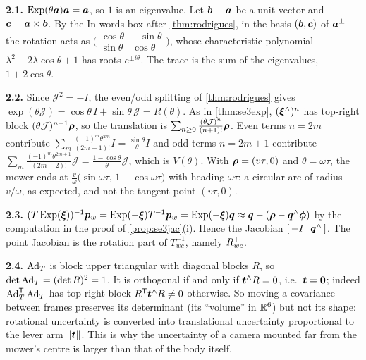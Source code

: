 \textbf{2.1.} $\operatorname{Exp}(\theta\bm{a})\bm{a}=\bm{a}$, so $1$ is an
eigenvalue. Let $\bm{b}\perp\bm{a}$ be a unit vector and
$\bm{c}=\bm{a}\times\bm{b}$. By the In-words box after
\cref{thm:rodrigues}, in the basis $(\bm{b},\bm{c})$ of
$\bm{a}^\perp$ the rotation acts as $\bigl(\begin{smallmatrix}
\cos\theta&-\sin\theta\\\sin\theta&\cos\theta\end{smallmatrix}\bigr)$,
whose characteristic polynomial $\lambda^2-2\lambda\cos\theta+1$ has
roots $e^{\pm i\theta}$. The trace is the sum of the eigenvalues,
$1+2\cos\theta$.

\textbf{2.2.} Since $\mathcal{J}^2=-I$, the even/odd splitting of
\cref{thm:rodrigues} gives $\exp(\theta\mathcal{J})=\cos\theta\,I+
\sin\theta\,\mathcal{J}=R(\theta)$. As in \cref{thm:se3exp},
$(\bm{\xi}^{\wedge})^n$ has top-right block $(\theta\mathcal{J})^{n-1}\bm{\rho}$,
so the translation is $\sum_{n\ge0}\frac{(\theta\mathcal{J})^n}{(n+1)!}
\bm{\rho}$. Even terms $n=2m$ contribute $\sum_m\frac{(-1)^m\theta^{2m}}
{(2m+1)!}I=\frac{\sin\theta}{\theta}I$ and odd terms $n=2m+1$
contribute $\sum_m\frac{(-1)^m\theta^{2m+1}}{(2m+2)!}\mathcal{J}=
\frac{1-\cos\theta}{\theta}\mathcal{J}$, which is $V(\theta)$. With
$\bm{\rho}=(v\tau,0)$ and $\theta=\omega\tau$, the mower ends at
$\frac{v}{\omega}\bigl(\sin\omega\tau,\,1-\cos\omega\tau\bigr)$ with
heading $\omega\tau$: a circular arc of radius $v/\omega$, as expected,
and not the tangent point $(v\tau,0)$.

\textbf{2.3.} $(T\operatorname{Exp}(\bm{\xi}))^{-1}\bm{p}_w=\operatorname{Exp}(-\bm{\xi})T^{-1}\bm{p}_w=\operatorname{Exp}(-\bm{\xi})
\bm{q}\approx\bm{q}-(\bm{\rho}-\bm{q}^{\wedge}\bm{\phi})$ by the computation
in the proof of \cref{prop:se3jac}(i). Hence the Jacobian
$[\,-I\ \ \bm{q}^{\wedge}\,]$. The point Jacobian is the rotation part
of $T_{wc}^{-1}$, namely $R_{wc}^{\mathsf{T}}$.

\textbf{2.4.} $\operatorname{Ad}_T$ is block upper triangular with diagonal blocks
$R$, so $\det\operatorname{Ad}_T=(\det R)^2=1$. It is orthogonal if and only if
$\bm{t}^{\wedge}R=0$, i.e.\ $\bm{t}=\bm{0}$; indeed
$\operatorname{Ad}_T^{\mathsf{T}}\operatorname{Ad}_T$ has top-right block $R^{\mathsf{T}}\bm{t}^{\wedge}R\ne0$ otherwise.
So moving a covariance between frames preserves its determinant (its
``volume'' in $\mathbb{R}^6$) but not its shape: rotational uncertainty is
converted into translational uncertainty proportional to the lever arm
$\left\lVert \bm{t}\right\rVert$. This is why the uncertainty of a camera mounted far
from the mower's centre is larger than that of the body itself.
